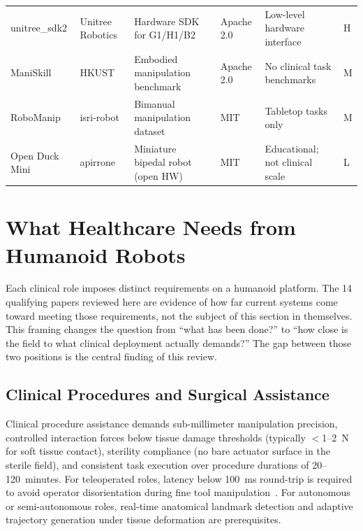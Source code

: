 \documentclass[acmjour]{acmart}
\begin{document}
\begin{table}[t]
{\begin{tabular}{@{}llllp{4.5cm}l@{}}
    unitree\_sdk2      & Unitree Robotics      & Hardware SDK for G1/H1/B2         & Apache 2.0  & Low-level hardware interface           & H \\
    ManiSkill          & HKUST                 & Embodied manipulation benchmark   & Apache 2.0  & No clinical task benchmarks            & M \\
    RoboManip          & isri-robot            & Bimanual manipulation dataset     & MIT         & Tabletop tasks only                    & M \\
    Open Duck Mini     & apirrone              & Miniature bipedal robot (open HW) & MIT         & Educational; not clinical scale        & L \\
    \bottomrule
  \end{tabular}%
  }
\end{table}

\section{What Healthcare Needs from Humanoid Robots}
\label{sec:applications}

Each clinical role imposes distinct requirements on a humanoid platform. The
14 qualifying papers reviewed here are evidence of how far current systems
come toward meeting those requirements, not the subject of this section in
themselves. This framing changes the question from ``what has been done?'' to
``how close is the field to what clinical deployment actually demands?'' The
gap between those two positions is the central finding of this review.

\subsection{Clinical Procedures and Surgical Assistance}
\label{sec:procedures}

Clinical procedure assistance demands sub-millimeter manipulation precision,
controlled interaction forces below tissue damage thresholds (typically
$<$1--2~N for soft tissue contact), sterility compliance (no bare actuator
surface in the sterile field), and consistent task execution over procedure
durations of 20--120~minutes. For teleoperated roles, latency below 100~ms
round-trip is required to avoid operator disorientation during fine tool
manipulation~\cite{lum2009latency,avgousti2016medical}. For autonomous or semi-autonomous roles, real-time anatomical
landmark detection and adaptive trajectory generation under tissue deformation
are prerequisites.
\end{document}
